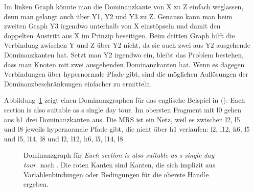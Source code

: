Im linken Graph könnte man die Dominanzkante von X zu Z einfach weglassen, denn man gelangt auch
über Y1, Y2 und Y3 zu Z. Genauso kann man beim zweiten Graph Y3 irgendwo unterhalb von X einstöpseln
und damit den doppelten Austritt aus X im Prinzip beseitigen. Beim dritten Graph hilft die
Verbindung zwischen Y und Z über Y2 nicht, da sie auch zwei aus Y2 ausgehende Dominanzkanten hat. Setzt man
Y2 irgendwo ein, bleibt das Problem bestehen, dass man Knoten mit zwei ausgehenden Dominanzkanten
hat. Wenn es dagegen Verbindungen über hypernormale Pfade gibt, sind die möglichen Auflösungen der
Dominanzbeschränkungen einfacher zu ermitteln.

Abbildung~\ref{Abbildung 1 von FKT2005a} zeigt einen Dominanzgraphen für das englische Beispiel in
():
\ea
Each section is also suitable as s single day tour.
\z
Im obersten Fragment mit l0 gehen aus h1 drei Dominanzkanten aus. Die MRS ist ein Netz, weil es
zwischen l2, l5 und l8 jeweils hypernormale Pfade gibt, die nicht über h1 verlaufen: l2, l12, h6, l5
und l5, l14, l8 und l2, l12, h6, l5, l14, l8. 
\begin{figure}
\caption{Dominanzgraph für \emph{Each section is also suitable as s single day tour.} nach
  \citet[132]{FKT2005a}. Die roten Kanten sind Kanten, die sich implizit aus Variablenbindungen oder
  Bedingungen für die oberste Handle ergeben.}\label{Abbildung 1 von FKT2005a}
\end{figure}

